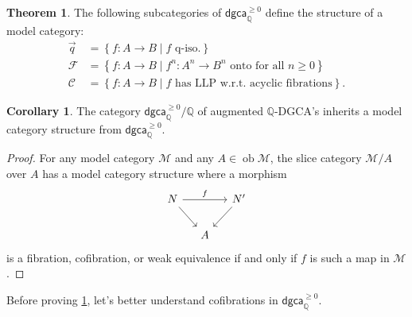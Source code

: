 \documentclass[10pt,letterpaper,cm]{nupset}
\theoremstyle{definition}
\theoremstyle{theorem}
\newtheorem{theorem}[defn]{Theorem}
\newtheorem{corollary}[defn]{Corollary}
\theoremstyle{remark}
\newcommand{\Q}{\mathbb Q}
\newcommand{\1}{\mathbb{1}}
\newcommand{\cf}{\mathscr{C}}
\newcommand{\f}{\mathscr{F}}
\newcommand{\q}{\vec q}
\newcommand{\m}{\mathcal{M}}
\newcommand{\dgca}{\mathsf{dgca}}
\newcommand{\0}{\vec 0}
\DeclareMathOperator{\ob}{ob}
\begin{document}
\begin{theorem}\label{dgcamod}
The following subcategories of $\dgca_{\Q}^{\geq 0}$ define the structure of a model category:
\begin{align*}
\q & = \left\{f : A \to B \mid \text{$f$ q-iso.}\right\}
\\ \f & = \left\{f : A \to B \mid \text{$f^n : A^n \to B^n$ onto for all $n\geq 0$}\right\}
\\ \cf & = \left\{f: A \to B \mid \text{$f$ has LLP w.r.t. acyclic fibrations}\right\}.
\end{align*}
\end{theorem}

\begin{corollary}
The category $\dgca_{\Q}^{\geq 0}/\Q$ of augmented $\Q$-DGCA's inherits a model category structure from $\dgca_{\Q}^{\geq 0}$.
\end{corollary}
\begin{proof}
For any model category $\m$ and any $A \in \ob{\m}$, the slice category $\m/A$ over $A$ has a model category structure where a morphism 
\[
\begin{tikzcd}[column sep =small]
	N & {} & N' \\
	& A
	\arrow[from=1-1, to=2-2]
	\arrow["f", from=1-1, to=1-3]
	\arrow[from=1-3, to=2-2]
\end{tikzcd}
\] is a fibration, cofibration, or weak equivalence if and only if $f$ is such a map in $\m$.
\end{proof}

Before proving \cref{dgcamod}, let's better understand cofibrations in $\dgca_{\Q}^{\geq 0}$.
\end{document}
